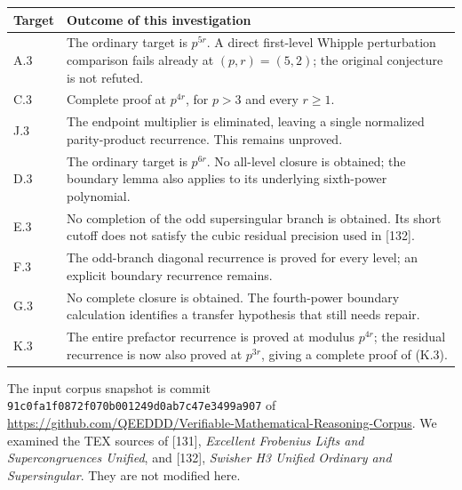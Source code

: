 \documentclass[11pt,letterpaper]{article}
\numberwithin{equation}{section}
\begin{document}
\begin{center}\small
\begin{tabular}{@{}lp{105mm}@{}}\toprule
Target & Outcome of this investigation\\\midrule
A.3 & The ordinary target is $p^{5r}$. A direct first-level Whipple
perturbation comparison fails already at $(p,r)=(5,2)$; the original
conjecture is not refuted.\\
C.3 & Complete proof at $p^{4r}$, for $p>3$ and every $r\ge1$.\\
J.3 & The endpoint multiplier is eliminated, leaving a single normalized parity-product recurrence. This remains unproved.\\
D.3 & The ordinary target is $p^{6r}$. No all-level closure is obtained;
the boundary lemma also applies to its underlying sixth-power polynomial.\\
E.3 & No completion of the odd supersingular branch is obtained.
Its short cutoff does not satisfy the cubic residual precision used in [132].\\
F.3 & The odd-branch diagonal recurrence is proved for every level;
an explicit boundary recurrence remains.\\
G.3 & No complete closure is obtained. The fourth-power boundary
calculation identifies a transfer hypothesis that still needs repair.\\
K.3 & The entire prefactor recurrence is proved at modulus $p^{4r}$;
the residual recurrence is now also proved at $p^{3r}$, giving a complete proof of (K.3).\\\bottomrule
\end{tabular}
\end{center}

The input corpus snapshot is commit
\texttt{91c0fa1f0872f070b001249d0ab7c47e3499a907} of
\url{https://github.com/QEEDDD/Verifiable-Mathematical-Reasoning-Corpus}.
We examined the TEX sources of [131], \emph{Excellent Frobenius Lifts
and Supercongruences Unified}, and [132], \emph{Swisher H3 Unified
Ordinary and Supersingular}. They are not modified here.
\end{document}
